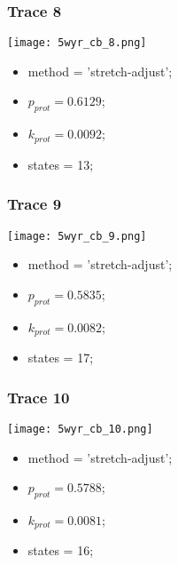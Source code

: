 \subsubsection{Trace 8}
\begin{minipage}[c]{0.7\textwidth}
    \texttt{[image: 5wyr\_cb\_8.png]}
\end{minipage}
\hfill
\begin{minipage}[c]{0.45\textwidth}
    \begin{itemize}
        \item method = 'stretch-adjust';
        \item $p_{prot}=0.6129$;
        \item $k_{prot}=0.0092$;
        \item states = 13;
    \end{itemize}
\end{minipage}

\subsubsection{Trace 9}
\begin{minipage}[c]{0.7\textwidth}
    \texttt{[image: 5wyr\_cb\_9.png]}
\end{minipage}
\hfill
\begin{minipage}[c]{0.45\textwidth}
    \begin{itemize}
        \item method = 'stretch-adjust';
        \item $p_{prot}=0.5835$;
        \item $k_{prot}=0.0082$;
        \item states = 17;
    \end{itemize}
\end{minipage}

\subsubsection{Trace 10}
\begin{minipage}[c]{0.7\textwidth}
    \texttt{[image: 5wyr\_cb\_10.png]}
\end{minipage}
\hfill
\begin{minipage}[c]{0.45\textwidth}
    \begin{itemize}
        \item method = 'stretch-adjust';
        \item $p_{prot}=0.5788$;
        \item $k_{prot}=0.0081$;
        \item states = 16;
    \end{itemize}
\end{minipage}

